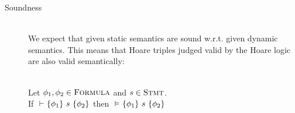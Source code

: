 \begin{description}
\begin{comment}
        \item 
        Given that
        \begin{mathpar}
            \inferrule* [Right=HoareStaticAssert]
            {
                \phiImplies{\phi}{\phi_a}
            }
            {
                \thoare {~} {\phi} {\sAssert {$\phi_a$}} {\phi}
            }
        \end{mathpar}
        is the only Hoare rule for assertions, it follows that
        \begin{displaymath}
        \wsp(\sAssert {$\phi_a$}) = \{~ \pi \in \setProgramState ~|~ \evalphiGen{\pi}{\phi_a} ~\}
        \end{displaymath}
    \end{itemize}
    
    
    \end{comment}
    
    
\item[Soundness]~\\
    We expect that given static semantics are sound w.r.t. given dynamic semantics.
    This means that Hoare triples judged valid by the Hoare logic are also valid semantically:
    \begin{definition}[Soundness]\label{def:snd}~\\
        Let $\phi_1, \phi_2 \in \textup{\textsc{Formula}}$ and $s \in \textup{\textsc{Stmt}}$.\\
        If ${} \,\,{\vdash}\,\, \{{\phi_1}\} ~{s}~ \{{\phi_2}\}$ then ${} \,\,{\vDash}\,\, \{{\phi_1}\} ~{s}~ \{{\phi_2}\}$
    \end{definition}
\end{description}

